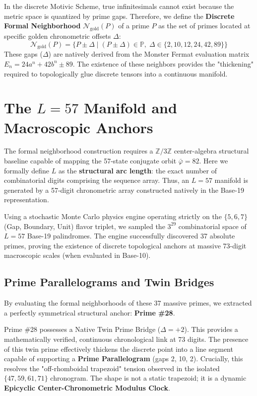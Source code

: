 In the discrete Motivic Scheme, true infinitesimals cannot exist because the metric space is quantized by prime gaps. Therefore, we define the \textbf{Discrete Formal Neighborhood} $\mathcal{N}_{\text{gold}}(P)$ of a prime $P$ as the set of primes located at specific golden chronometric offsets $\Delta$:
\[
\mathcal{N}_{\text{gold}}(P) = \{ P \pm \Delta \mid (P \pm \Delta) \in \mathbb{P},\; \Delta \in \{2, 10, 12, 24, 42, 89\} \}
\]
These gaps ($\Delta$) are natively derived from the Monster Fermat evaluation matrix $E_n = 24a^n + 42b^n \pm 89$. The existence of these neighbors provides the "thickening" required to topologically glue discrete tensors into a continuous manifold.

\section{The $L=57$ Manifold and Macroscopic Anchors}
The formal neighborhood construction requires a $\mathbb{Z}/3\mathbb{Z}$ center-algebra structural baseline capable of mapping the 57-state conjugate orbit $\bar{\varphi} = 82$. Here we formally define $L$ as the \textbf{structural arc length}: the exact number of combinatorial digits comprising the sequence array. Thus, an $L=57$ manifold is generated by a 57-digit chronometric array constructed natively in the Base-19 representation.

Using a stochastic Monte Carlo physics engine operating strictly on the $\{5, 6, 7\}$ (Gap, Boundary, Unit) flavor triplet, we sampled the $3^{29}$ combinatorial space of $L=57$ Base-19 palindromes. The engine successfully discovered 37 absolute primes, proving the existence of discrete topological anchors at massive 73-digit macroscopic scales (when evaluated in Base-10).

\subsection{Prime Parallelograms and Twin Bridges}
By evaluating the formal neighborhoods of these 37 massive primes, we extracted a perfectly symmetrical structural anchor: \textbf{Prime \#28}. 

Prime \#28 possesses a Native Twin Prime Bridge ($\Delta = +2$). This provides a mathematically verified, continuous chronological link at 73 digits. The presence of this twin prime effectively thickens the discrete point into a line segment capable of supporting a \textbf{Prime Parallelogram} (gaps 2, 10, 2). Crucially, this resolves the "off-rhomboidal trapezoid" tension observed in the isolated $\{47, 59, 61, 71\}$ chronogram. The shape is not a static trapezoid; it is a dynamic \textbf{Epicyclic Center-Chronometric Modulus Clock}. 

